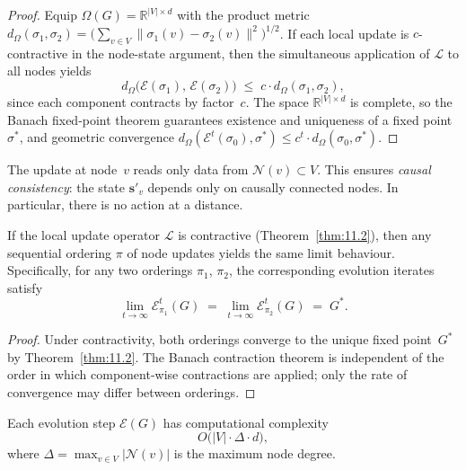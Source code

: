 \begin{proof}
Equip $\Omega(G) = \mathbb{R}^{|V| \times d}$ with the product metric
$d_\Omega(\sigma_1, \sigma_2) = \bigl(\sum_{v \in V}
\|\sigma_1(v) - \sigma_2(v)\|^2\bigr)^{1/2}$.
If each local update is $c$-contractive in the node-state argument,
then the simultaneous application of $\mathcal{L}$ to all nodes
yields
\[
  d_\Omega\bigl(\mathcal{E}(\sigma_1),\, \mathcal{E}(\sigma_2)\bigr)
  \;\leq\;
  c \cdot d_\Omega(\sigma_1, \sigma_2),
\]
since each component contracts by factor~$c$.  The space
$\mathbb{R}^{|V| \times d}$ is complete, so the Banach fixed-point
theorem guarantees existence and uniqueness of a fixed point~$\sigma^*$,
and geometric convergence
$d_\Omega(\mathcal{E}^t(\sigma_0), \sigma^*) \leq c^t \cdot
d_\Omega(\sigma_0, \sigma^*)$.
\end{proof}

\begin{remark}
\label{rem:11.1}
The update at node~$v$ reads only data from $\mathcal{N}(v) \subset V$.
This ensures \emph{causal consistency}: the state $\mathbf{s}'_v$
depends only on causally connected nodes.  In particular, there is no
action at a distance.
\end{remark}

\begin{lemma}
\label{lem:11.3}
If the local update operator $\mathcal{L}$ is contractive
(Theorem~\ref{thm:11.2}), then any sequential ordering
$\pi$ of node updates yields the same limit behaviour.
Specifically, for any two orderings $\pi_1$, $\pi_2$, the
corresponding evolution iterates satisfy
\[
  \lim_{t \to \infty}
  \mathcal{E}_{\pi_1}^t(G)
  \;=\;
  \lim_{t \to \infty}
  \mathcal{E}_{\pi_2}^t(G)
  \;=\; G^*.
\]
\end{lemma}

\begin{proof}
Under contractivity, both orderings converge to the unique fixed
point~$G^*$ by Theorem~\ref{thm:11.2}.  The Banach contraction
theorem is independent of the order in which component-wise
contractions are applied; only the rate of convergence may differ
between orderings.
\end{proof}

\begin{theorem}
\label{thm:11.3}
Each evolution step $\mathcal{E}(G)$ has computational complexity
\begin{equation}
\label{eq:11.complexity}
  O\!\bigl(|V| \cdot \Delta \cdot d\bigr),
\end{equation}
where $\Delta = \max_{v \in V} |\mathcal{N}(v)|$ is the maximum
node degree.
\end{theorem}

